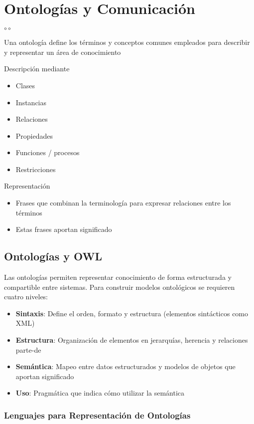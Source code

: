 \chapter{Ontologías y Comunicación}
$\circ\circ$


Una ontología define los términos y conceptos comunes
empleados para describir y representar un área de
conocimiento   

Descripción mediante
\begin{itemize}
	\item Clases
	\item Instancias
	\item Relaciones
	\item Propiedades
	\item Funciones / procesos
	\item Restricciones
\end{itemize}
Representación
\begin{itemize}
	\item Frases que combinan la
terminología para expresar
relaciones entre los términos
	\item Estas frases aportan
significado
\end{itemize}

\section{Ontologías y OWL}

Las ontologías permiten representar conocimiento de forma estructurada y compartible entre sistemas. Para construir modelos ontológicos se requieren cuatro niveles:

\begin{itemize}
    \item \textbf{Sintaxis}: Define el orden, formato y estructura (elementos sintácticos como XML)
    \item \textbf{Estructura}: Organización de elementos en jerarquías, herencia y relaciones parte-de
    \item \textbf{Semántica}: Mapeo entre datos estructurados y modelos de objetos que aportan significado
    \item \textbf{Uso}: Pragmática que indica cómo utilizar la semántica
\end{itemize}

\subsection{Lenguajes para Representación de Ontologías}


